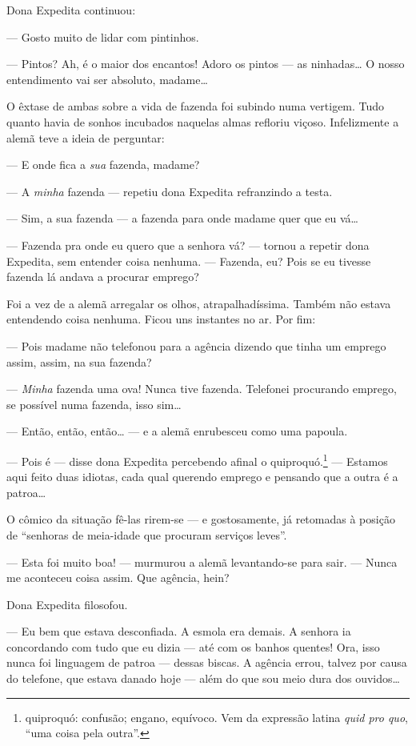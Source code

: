 Dona Expedita continuou:

--- Gosto muito de lidar com pintinhos.

--- Pintos? Ah, é o maior dos encantos! Adoro os pintos --- as
ninhadas\ldots{} O nosso entendimento vai ser absoluto, madame\ldots{}

O êxtase de ambas sobre a vida de fazenda foi subindo numa vertigem.
Tudo quanto havia de sonhos incubados naquelas almas refloriu viçoso.
Infelizmente a alemã teve a ideia de perguntar:

--- E onde fica a \emph{sua} fazenda, madame?

--- A \emph{minha} fazenda --- repetiu dona Expedita refranzindo a
testa.

--- Sim, a sua fazenda --- a fazenda para onde madame quer que eu vá\ldots{}

--- Fazenda pra onde eu quero que a senhora vá? --- tornou a repetir
dona Expedita, sem entender coisa nenhuma. --- Fazenda, eu? Pois se eu
tivesse fazenda lá andava a procurar emprego?

Foi a vez de a alemã arregalar os olhos, atrapalhadíssima. Também não
estava entendendo coisa nenhuma. Ficou uns instantes no ar. Por fim:

--- Pois madame não telefonou para a agência dizendo que tinha um
emprego assim, assim, na sua fazenda?

--- \emph{Minha} fazenda uma ova! Nunca tive fazenda. Telefonei
procurando emprego, se possível numa fazenda, isso sim\ldots{}

--- Então, então, então\ldots{} --- e a alemã enrubesceu como uma papoula.

--- Pois é --- disse dona Expedita percebendo afinal o
quiproquó.\footnote{quiproquó: confusão; engano, equívoco. Vem da
  expressão latina \emph{quid pro quo}, ``uma coisa pela outra''.} ---
Estamos aqui feito duas idiotas, cada qual querendo emprego e pensando
que a outra é a patroa\ldots{}

O cômico da situação fê-las rirem-se --- e gostosamente, já retomadas à
posição de ``senhoras de meia-idade que procuram serviços leves''.

--- Esta foi muito boa! --- murmurou a alemã levantando-se para sair.
--- Nunca me aconteceu coisa assim. Que agência, hein?

Dona Expedita filosofou.

--- Eu bem que estava desconfiada. A esmola era demais. A senhora ia
concordando com tudo que eu dizia --- até com os banhos quentes! Ora,
isso nunca foi linguagem de patroa --- dessas biscas. A agência errou,
talvez por causa do telefone, que estava danado hoje --- além do que sou
meio dura dos ouvidos\ldots{}

